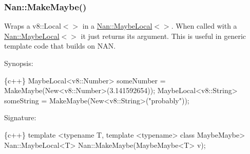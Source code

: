  \subsubsection*{Nan\+::\+Make\+Maybe()}

Wraps a {\ttfamily v8\+::\+Local$<$$>$} in a {\ttfamily \hyperlink{class_nan_1_1_maybe_local}{Nan\+::\+Maybe\+Local}$<$$>$}. When called with a {\ttfamily \hyperlink{class_nan_1_1_maybe_local}{Nan\+::\+Maybe\+Local}$<$$>$} it just returns its argument. This is useful in generic template code that builds on N\+AN.

Synopsis\+:


\begin{DoxyCode}
\{c++\}
  MaybeLocal<v8::Number> someNumber = MakeMaybe(New<v8::Number>(3.141592654));
  MaybeLocal<v8::String> someString = MakeMaybe(New<v8::String>("probably"));
\end{DoxyCode}


Signature\+:


\begin{DoxyCode}
\{c++\}
template <typename T, template <typename> class MaybeMaybe>
Nan::MaybeLocal<T> Nan::MakeMaybe(MaybeMaybe<T> v);
\end{DoxyCode}
 